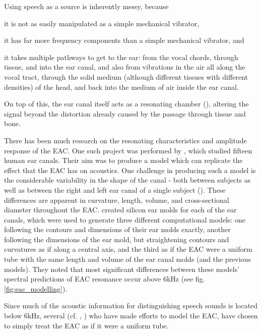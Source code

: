 \documentclass[dissertation,copyright]{uathesis}
\begin{document}
Using speech as a source is inherently messy, because 
\begin{enumerate*}[label={\alph*)}]
  \item  it is not as easily manipulated as a simple mechanical vibrator,
  \item  it has far more frequency components than a simple mechanical vibrator, and 
  \item  it takes multiple pathways to get to the ear: from the vocal chords, through tissue, and into the ear canal, and also from vibrations in the air all along the vocal tract, through the solid medium (although different tissues with different densities) of the head, and back into the medium of air inside the ear canal.
\end{enumerate*}
On top of this, the ear canal itself acts as a resonating chamber (\cite{rosen:91}), altering the signal beyond the distortion already caused by the passage through tissue and bone.  

There has been much research on the resonating characteristics and amplitude response of the EAC.  One such project was performed by \cite{stinson:89}, which studied fifteen human ear canals.  Their aim was to produce a model which can replicate the effect that the EAC has on acoustics.
One challenge in producing such a model is the considerable variability in the shape of the canal - both between subjects as well as between the right and left ear canal of a single subject (\cite{stinson:89}).  These differences are apparent in curvature, length, volume, and cross-sectional diameter throughout the EAC.  \cite{stinson:89} created silicon ear molds for each of the ear canals, which were used to generate three different computational models: one following the contours and dimensions of their ear molds exactly, another following the dimensions of the ear mold, but straightening contours and curvatures as if along a central axis, and the third as if the EAC were a uniform tube with the same length and volume of the ear canal molds (and the previous models).  They noted that most significant differences between these models' spectral predictions of EAC resonance occur above 6kHz (see fig. \ref{fig:eac_modelling}).  

Since much of the acoustic information for distinguishing speech sounds is located below 6kHz, several (cf. \cite{stinson:89}, \cite{hansen:97b} \cite{stenfelt:07}) who have made efforts to model the EAC, have chosen to simply treat the EAC as if it were a uniform tube.
\end{document}
